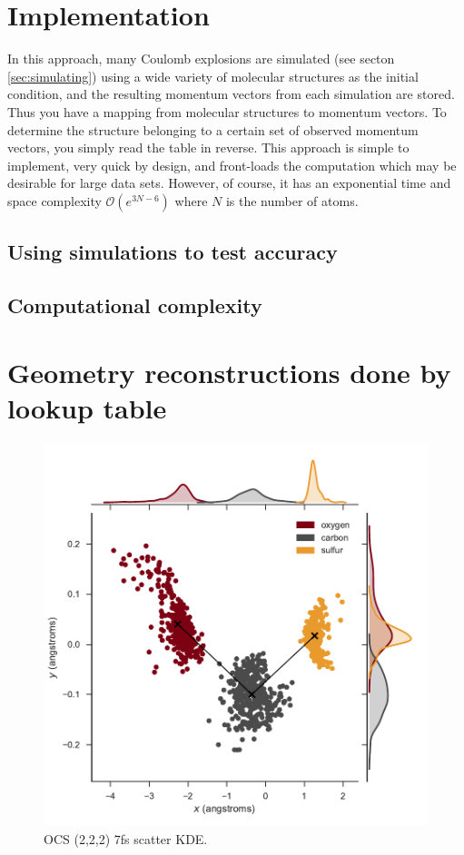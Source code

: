 \section{Implementation}
In this approach, many Coulomb explosions are simulated (see secton \ref{sec:simulating}) using a wide variety of molecular structures as the initial condition, and the resulting momentum vectors from each simulation are stored. Thus you have a mapping from molecular structures to momentum vectors. To determine the structure belonging to a certain set of observed momentum vectors, you simply read the table in reverse. This approach is simple to implement, very quick by design, and front-loads the computation which may be desirable for large data sets. However, of course, it has an exponential time and space complexity $\mathcal{O}(e^{3N-6})$ where $N$ is the number of atoms.

\subsection{Using simulations to test accuracy}
\subsection{Computational complexity}

\section{Geometry reconstructions done by lookup table}

\pagebreak
\begin{figure}
  \centering
  \includegraphics[width=\textwidth]{Plots/OCS2227fsScatterKde}
  \caption[OCS (2,2,2) 7fs scatter KDE.]
  {OCS (2,2,2) 7fs scatter KDE.}
  \label{fig:OCS2227fsScatterKde}
\end{figure}
\clearpage

